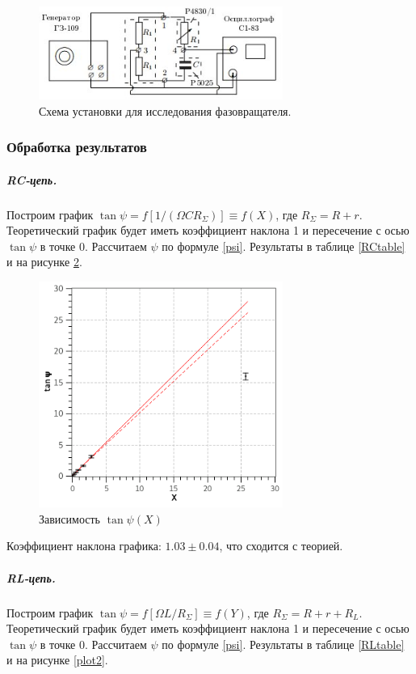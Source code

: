 \documentclass{article}
\begin{document}
   \begin{figure}[h]
   \centering
   \includegraphics[width=8cm]{fig4.jpg} 
   \caption{Схема установки для исследования фазовращателя.} 
   \label{fig.4} 
   \end{figure}
   
   \subsubsection*{Обработка результатов}
   \subparagraph*{RC-цепь.}
   Построим график $\tan \psi = f[1 / (\Omega C R_{\Sigma})] \equiv f(X)$, где $R_\Sigma = R + r$. Теоретический график будет иметь коэффициент наклона 1 и пересечение с осью $\tan \psi$ в точке $0$. Рассчитаем $\psi$ по формуле \eqref{psi}. Результаты в таблице \ref{RCtable} и на рисунке \ref{plot1}.

   
   \begin{figure}[h]
   \centering
   \includegraphics[width=8cm]{plot1.png} 
   \caption{Зависимость $\tan \psi (X)$} 
   \label{plot1} 
   \end{figure}

   Коэффициент наклона графика: $1.03 \pm 0.04$, что сходится с теорией.

   \subparagraph*{RL-цепь.}
   Построим график $\tan \psi = f[\Omega L / R_{\Sigma}] \equiv f(Y)$, где $R_\Sigma = R + r + R_L$. Теоретический график будет иметь коэффициент наклона 1 и пересечение с осью $\tan \psi$ в точке $0$. Рассчитаем $\psi$ по формуле \eqref{psi}. Результаты в таблице \ref{RLtable} и на рисунке \ref{plot2}.
\end{document}

